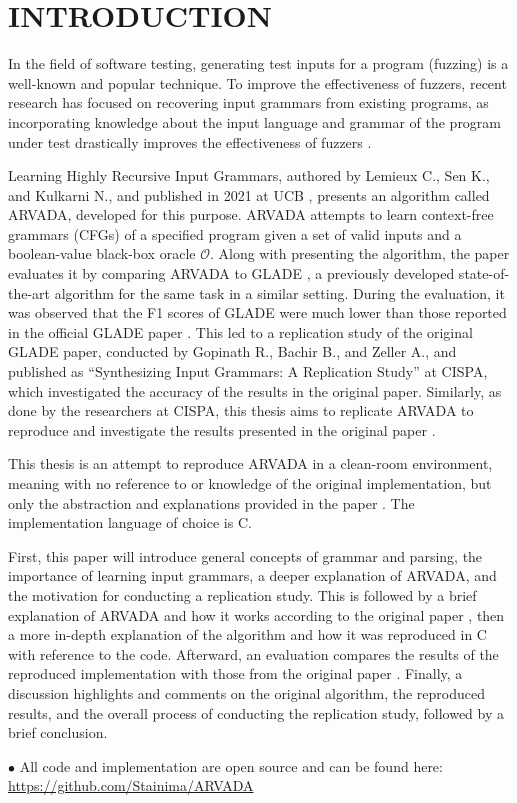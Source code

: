 \chapter{INTRODUCTION}

In the field of software testing, generating test inputs for a program (fuzzing) is a well-known and popular technique. To improve the effectiveness of fuzzers, recent research has focused on recovering input grammars from existing programs, as incorporating knowledge about the input language and grammar of the program under test drastically improves the effectiveness of fuzzers \cite{gopinathBuildingFastFuzzers2019}.

\vspace{\baselineskip}
Learning Highly Recursive Input Grammars, authored by Lemieux C., Sen K., and Kulkarni N., and published in 2021 at UCB \cite{kulkarniLearningHighlyRecursive2021}, presents an algorithm called ARVADA, developed for this purpose. ARVADA attempts to learn context-free grammars (CFGs) of a specified program given a set of valid inputs and a boolean-value black-box oracle $\mathcal{O}$. Along with presenting the algorithm, the paper evaluates it by comparing ARVADA to GLADE \cite{bastaniSynthesizingProgramInput}, a previously developed state-of-the-art algorithm for the same task in a similar setting.
During the evaluation, it was observed that the F1 scores of GLADE were much lower than those reported in the official GLADE paper \cite{bastaniSynthesizingProgramInput}. This led to a replication study of the original GLADE paper, conducted by Gopinath R., Bachir B., and Zeller A., and published as “Synthesizing Input Grammars: A Replication Study” \cite{bendrissouSynthesizingInputGrammars2022} at CISPA, which investigated the accuracy of the results in the original paper. Similarly, as done by the researchers at CISPA, this thesis aims to replicate ARVADA to reproduce and investigate the results presented in the original paper \cite{kulkarniLearningHighlyRecursive2021}.

\vspace{\baselineskip}
This thesis is an attempt to reproduce ARVADA in a clean-room environment, meaning with no reference to or knowledge of the original implementation, but only the abstraction and explanations provided in the paper \cite{kulkarniLearningHighlyRecursive2021}. The implementation language of choice is C.

\vspace{\baselineskip}
First, this paper will introduce general concepts of grammar and parsing, the importance of learning input grammars, a deeper explanation of ARVADA, and the motivation for conducting a replication study. This is followed by a brief explanation of ARVADA and how it works according to the original paper \cite{kulkarniLearningHighlyRecursive2021}, then a more in-depth explanation of the algorithm and how it was reproduced in C with reference to the code. Afterward, an evaluation compares the results of the reproduced implementation with those from the original paper \cite{kulkarniLearningHighlyRecursive2021}. Finally, a discussion highlights and comments on the original algorithm, the reproduced results, and the overall process of conducting the replication study, followed by a brief conclusion.

$\bullet$ All code and implementation are open source and can be found here: \url{https://github.com/Stainima/ARVADA}